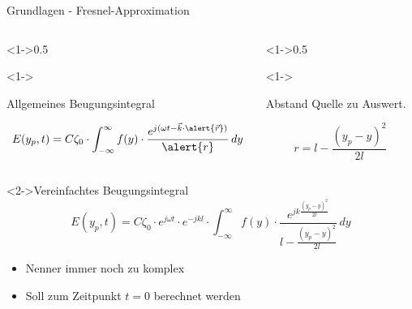 \begin{frame}{Grundlagen - Fresnel-Approximation}
    \begin{columns}
        \begin{column}[t]<1->{0.5\textwidth}
            \begin{block}<1->{\strut Allgemeines Beugungsintegral}
                \begin{equation*}
                    E(y_p, t)
                    =
                    C\zeta_0 \cdot \int_{-\infty}^{\infty}f(y)\cdot\frac{e^{j(\omega t - \vec{k}\cdot\alert{\vec{r}})}}{\alert{r}} \,dy
                \end{equation*}
            \end{block}
        \end{column}
        \begin{column}[t]<1->{0.5\textwidth}
            \begin{block}<1->{\strut Abstand Quelle zu Auswert.}
                \begin{equation*}
                    r
                    =
                    l - \frac{(y_p-y)^2}{2l}
                \end{equation*}
            \end{block}
        \end{column}
    \end{columns}

    \begin{block}<2->{Vereinfachtes Beugungsintegral}
        \begin{equation*}
            E(y_p, t)
            =
            C\zeta_0 \cdot e^{j\omega t} \cdot e^{-jkl} \cdot \int_{-\infty}^{\infty}f(y)\cdot\frac{e^{jk\frac{(y_p-y)^2}{2l}}}{l - \frac{(y_p-y)^2}{2l}} \,dy
        \end{equation*}
        \begin{itemize}
            \item<3-> Nenner immer noch zu komplex
            \item<4-> Soll zum Zeitpunkt $t=0$ berechnet werden
        \end{itemize}

    \end{block}
\end{frame}

